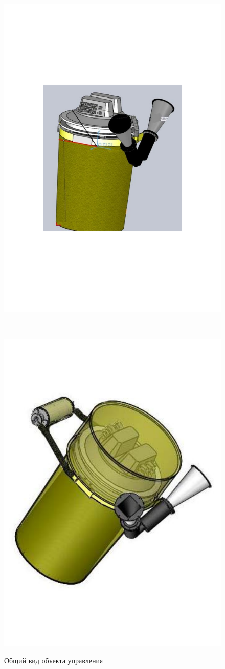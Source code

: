 \begin{figure}[ht!]
    \centering
    \begin{minipage}{0.45\textwidth}
        \centering
        \includegraphics[width=0.5\linewidth, keepaspectratio]
                        {./src/pictures/sattelite_3d_images/control_object_view_1}
        \label{control_object_view_1}
    \end{minipage}~
    \begin{minipage}{0.45\textwidth}
        \centering
        \includegraphics[width=0.5\linewidth, keepaspectratio]
                        {./src/pictures/sattelite_3d_images/control_object_view_2}
        \label{control_object_view_2}
    \end{minipage}

    \caption{Общий вид объекта управления}
    \label{control_object_general_view}
\end{figure}

